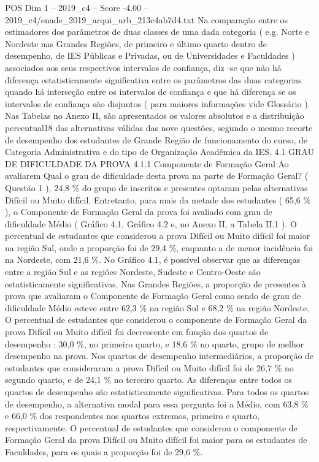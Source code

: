 \begin{textsample}{POS Dim 1 – 2019\_c4 – Score -4.00 – 2019\_c4/enade\_2019\_arqui\_urb\_213c4ab7d4.txt}
Na comparação entre os estimadores dos parâmetros de duas classes de uma dada categoria ( e.g.
Norte e Nordeste nas Grandes Regiões, de primeiro e último quarto dentro de desempenho, de IES Públicas e Privadas, ou de Universidades e Faculdades ) associados aos seus respectivos intervalos de confiança, diz -se que não há diferença estatisticamente significativa entre os parâmetros das duas categorias quando há interseção entre os intervalos de confiança e que há diferença se os intervalos de confiança são disjuntos ( para maiores informações vide Glossário ).
Nas Tabelas no Anexo II, são apresentados os valores absolutos e a distribuição percentual18 das alternativas válidas das nove questões, segundo o mesmo recorte de desempenho dos estudantes de Grande Região de funcionamento do curso, de Categoria Administrativa e do tipo de Organização Acadêmica da IES. 4.1 GRAU DE DIFICULDADE DA PROVA 4.1.1 Componente de Formação Geral Ao avaliarem Qual o grau de dificuldade desta prova na parte de Formação Geral? ( Questão 1 ), 24,8 \% do grupo de inscritos e presentes optaram pelas alternativas Difícil ou Muito difícil.
Entretanto, para mais da metade dos estudantes ( 65,6 \% ), o Componente de Formação Geral da prova foi avaliado com grau de dificuldade Médio ( Gráfico 4.1, Gráfico 4.2 e, no Anexo II, a Tabela II.1 ).
O percentual de estudantes que considerou a prova Difícil ou Muito difícil foi maior na região Sul, onde a proporção foi de 29,4 \%, enquanto a de menor incidência foi na Nordeste, com 21,6 \%.
No Gráfico 4.1, é possível observar que as diferenças entre a região Sul e as regiões Nordeste, Sudeste e Centro-Oeste são estatisticamente significativas.
Nas Grandes Regiões, a proporção de presentes à prova que avaliaram o Componente de Formação Geral como sendo de grau de dificuldade Médio esteve entre 62,3 \% na região Sul e 68,2 \% na região Nordeste.
O percentual de estudantes que considerou o componente de Formação Geral da prova Difícil ou Muito difícil foi decrescente em função dos quartos de desempenho : 30,0 \%, no primeiro quarto, e 18,6 \% no quarto, grupo de melhor desempenho na prova.
Nos quartos de desempenho intermediários, a proporção de estudantes que consideraram a prova Difícil ou Muito difícil foi de 26,7 \% no segundo quarto, e de 24,1 \% no terceiro quarto.
As diferenças entre todos os quartos de desempenho são estatisticamente significativas.
Para todos os quartos de desempenho, a alternativa modal para essa pergunta foi a Médio, com 63,8 \% e 66,0 \% dos respondentes nos quartos extremos, primeiro e quarto, respectivamente.
O percentual de estudantes que considerou o componente de Formação Geral da prova Difícil ou Muito difícil foi maior para os estudantes de Faculdades, para os quais a proporção foi de 29,6 \%.

\end{textsample}
